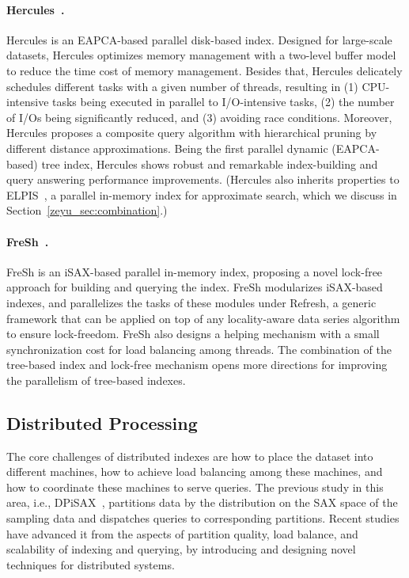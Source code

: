 \documentclass[11pt]{article}
\begin{document}
\paragraph{Hercules~\cite{hercules}.}
Hercules is an EAPCA-based parallel disk-based index.
Designed for large-scale datasets, Hercules optimizes memory management with a two-level buffer model to reduce the time cost of memory management.
Besides that, Hercules delicately schedules different tasks with a given number of threads, resulting in (1) CPU-intensive tasks being executed in parallel to I/O-intensive tasks, (2) the number of I/Os being significantly reduced, and (3) avoiding race conditions.
Moreover, Hercules proposes a composite query algorithm with hierarchical pruning by different distance approximations.
Being the first parallel dynamic (EAPCA-based) tree index, Hercules shows robust and remarkable index-building and query answering performance improvements. %
(Hercules also inherits properties to ELPIS~\cite{elpis}, a parallel in-memory index for approximate search, which we discuss in Section~\ref{zeyu_sec:combination}.)

\paragraph{FreSh~\cite{fresh}.}
FreSh is an iSAX-based parallel in-memory index, proposing a novel lock-free approach for building and querying the index.
FreSh modularizes iSAX-based indexes, and parallelizes the tasks of these modules under Refresh, a generic framework that can be applied on top of any locality-aware data series algorithm to ensure lock-freedom.
FreSh also designs a helping mechanism with a small synchronization cost for load balancing among threads.
The combination of the tree-based index and lock-free mechanism opens more directions for improving the parallelism of tree-based indexes.

\subsection{Distributed Processing}
The core challenges of distributed indexes are how to place the dataset into different machines, how to achieve load balancing among these machines, and how to coordinate these machines to serve queries. 
The previous study in this area, i.e., DPiSAX~\cite{dpisax}, partitions data by the distribution on the SAX space of the sampling data and dispatches queries to corresponding partitions.
Recent studies have advanced it from the aspects of partition quality, load balance, and scalability of indexing and querying, by introducing and designing novel techniques for distributed systems.
\end{document}
